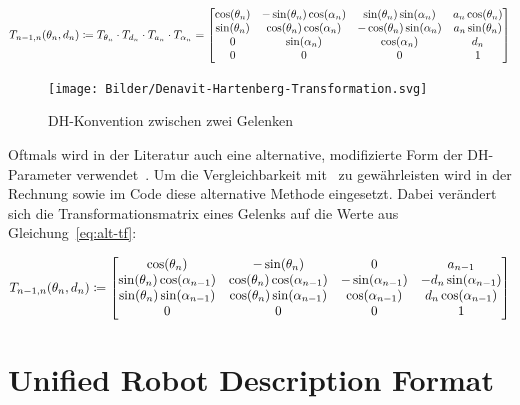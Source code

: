 \begin{equation}
    T_{n-1,n}(\theta_n, d_n) \coloneqq T_{\theta_n} \cdot T_{d_n} \cdot T_{a_n} \cdot T_{\alpha_n} =
    \begin{bmatrix}
        \cos(\theta_n) & -\sin(\theta_n)\cos(\alpha_n) & \sin(\theta_n)\sin(\alpha_n)  & a_n\cos(\theta_n) \\
        \sin(\theta_n) & \cos(\theta_n)\cos(\alpha_n)  & -\cos(\theta_n)\sin(\alpha_n) & a_n\sin(\theta_n) \\
        0   & \sin(\alpha_n)     & \cos(\alpha_n)     & d_n    \\
        0   & 0       & 0       & 1      \\
    \end{bmatrix}
    \label{eq:dh5}
\end{equation}

\begin{figure}[h]
    \centering
    \texttt{[image: Bilder/Denavit-Hartenberg-Transformation.svg]}
    \caption{DH-Konvention zwischen zwei Gelenken~\cite{jahobrCoordinateSystemsDenavitHartenberg2007}}\label{fig:dh-konvention1}
\end{figure}

Oftmals wird in der Literatur auch eine alternative, modifizierte Form der DH-Parameter verwendet~\cite[75]{craigIntroductionRoboticsMechanics2009}.
Um die Vergleichbarkeit mit~\cite{rasmusandersenKinematicsUR52018} zu gewährleisten wird in der Rechnung sowie im Code diese alternative Methode eingesetzt.
Dabei verändert sich die Transformationsmatrix eines Gelenks auf die Werte aus Gleichung~\ref{eq:alt-tf}:

\begin{equation}
    T_{n-1,n}(\theta_n, d_n) \coloneqq
    \begin{bmatrix}
        \cos(\theta_n)                   & -\sin(\theta_n)                  & 0                   & a_{n-1}                  \\
        \sin(\theta_n)\cos(\alpha_{n-1}) & \cos(\theta_n)\cos(\alpha_{n-1}) & -\sin(\alpha_{n-1}) & -d_{n}\sin(\alpha_{n-1}) \\
        \sin(\theta_n)\sin(\alpha_{n-1}) & \cos(\theta_n)\sin(\alpha_{n-1}) & \cos(\alpha_{n-1})  & d_{n}\cos(\alpha_{n-1})  \\
        0                     & 0                     & 0                   & 1                        \\
    \end{bmatrix}
    \label{eq:alt-tf}
\end{equation}


\section{Unified Robot Description Format}\label{sec:urdf}

